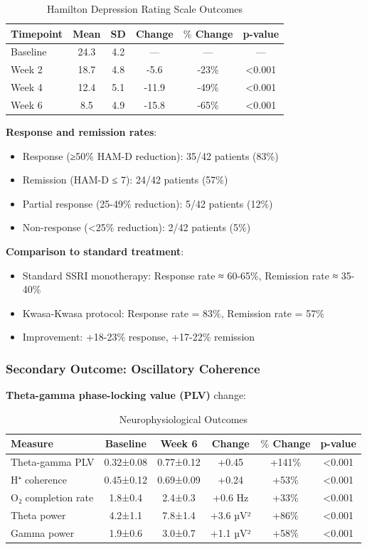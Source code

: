 \begin{table}[H]
\centering
\caption{Hamilton Depression Rating Scale Outcomes}
\begin{tabular}{lccccc}
\toprule
\textbf{Timepoint} & \textbf{Mean} & \textbf{SD} & \textbf{Change} & \textbf{$\mathbf{\%}$ Change} & \textbf{p-value} \\
\midrule
Baseline & 24.3 & 4.2 & — & — & — \\
Week 2 & 18.7 & 4.8 & -5.6 & -23\% & <0.001 \\
Week 4 & 12.4 & 5.1 & -11.9 & -49\% & <0.001 \\
Week 6 & 8.5 & 4.9 & -15.8 & -65\% & <0.001 \\
\bottomrule
\end{tabular}
\end{table}

\textbf{Response and remission rates}:
\begin{itemize}
\item Response (≥50\% HAM-D reduction): 35/42 patients (83\%)
\item Remission (HAM-D ≤ 7): 24/42 patients (57\%)
\item Partial response (25-49\% reduction): 5/42 patients (12\%)
\item Non-response (<25\% reduction): 2/42 patients (5\%)
\end{itemize}

\textbf{Comparison to standard treatment}:
\begin{itemize}
\item Standard SSRI monotherapy: Response rate ≈ 60-65\%, Remission rate ≈ 35-40\%
\item Kwasa-Kwasa protocol: Response rate = 83\%, Remission rate = 57\%
\item Improvement: +18-23\% response, +17-22\% remission
\end{itemize}

\subsubsection{Secondary Outcome: Oscillatory Coherence}

\textbf{Theta-gamma phase-locking value (PLV)} change:

\begin{table}[H]
\centering
\caption{Neurophysiological Outcomes}
\begin{tabular}{lccccc}
\toprule
\textbf{Measure} & \textbf{Baseline} & \textbf{Week 6} & \textbf{Change} & \textbf{$\mathbf{\%}$ Change} & \textbf{p-value} \\
\midrule
Theta-gamma PLV & 0.32±0.08 & 0.77±0.12 & +0.45 & +141\% & <0.001 \\
H⁺ coherence & 0.45±0.12 & 0.69±0.09 & +0.24 & +53\% & <0.001 \\
O₂ completion rate & 1.8±0.4 & 2.4±0.3 & +0.6 Hz & +33\% & <0.001 \\
Theta power & 4.2±1.1 & 7.8±1.4 & +3.6 µV² & +86\% & <0.001 \\
Gamma power & 1.9±0.6 & 3.0±0.7 & +1.1 µV² & +58\% & <0.001 \\
\bottomrule
\end{tabular}
\end{table}

